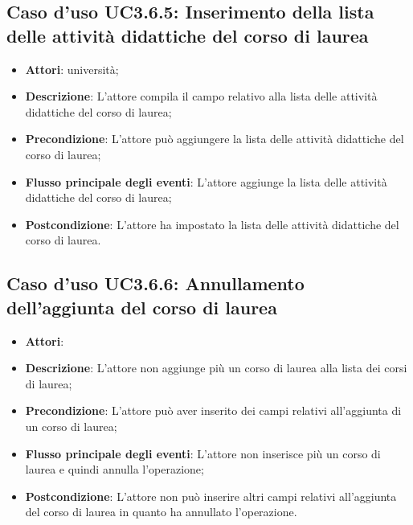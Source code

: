 \subsection{Caso d'uso \texorpdfstring{UC3.6.5}{UC3.6.5}: Inserimento della lista delle attività didattiche del corso di laurea}
\begin{itemize}
\item \textbf{Attori}: università;
\item \textbf{Descrizione}: L'attore compila il campo relativo alla  lista delle attività didattiche del corso di laurea;

\item \textbf{Precondizione}: L'attore può aggiungere la  lista delle attività didattiche del corso di laurea;

\item \textbf{Flusso principale degli eventi}: L'attore aggiunge la  lista delle attività didattiche del corso di laurea;

\item \textbf{Postcondizione}: L'attore ha impostato la  lista delle attività didattiche del corso di laurea.

\end{itemize}
\subsection{Caso d'uso \texorpdfstring{UC3.6.6}{UC3.6.6}: Annullamento dell'aggiunta del corso di laurea}
\begin{itemize}
\item \textbf{Attori}: 
\item \textbf{Descrizione}: L'attore non aggiunge più un corso di laurea alla lista dei corsi di laurea;

\item \textbf{Precondizione}: L'attore può aver inserito dei campi relativi all'aggiunta di un corso di laurea;

\item \textbf{Flusso principale degli eventi}: L'attore non inserisce più un corso di laurea e quindi annulla l'operazione;

\item \textbf{Postcondizione}: L'attore non può inserire altri campi relativi all'aggiunta del corso di laurea in quanto ha annullato l'operazione.

\end{itemize}
